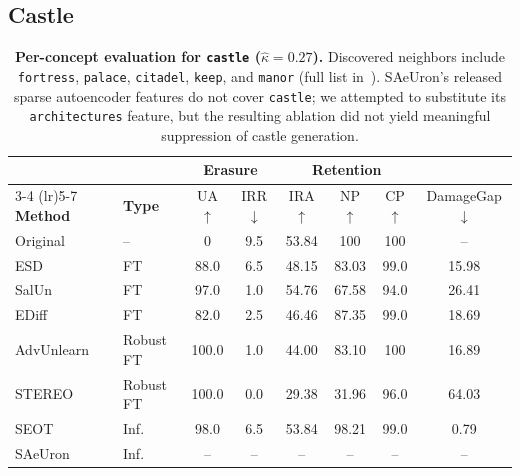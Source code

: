 \subsection{Castle}
\label{app:per_concept_castle}

\begin{table}[h]
\centering
\small
\setlength{\tabcolsep}{5pt}
\begin{tabular}{llcccccc}
\toprule
& & \multicolumn{2}{c}{\textbf{Erasure}} & \multicolumn{3}{c}{\textbf{Retention}} & \\
\cmidrule(lr){3-4} \cmidrule(lr){5-7}
\textbf{Method} & \textbf{Type} & UA$\uparrow$ & IRR$\downarrow$ & IRA$\uparrow$ & NP$\uparrow$ & CP$\uparrow$ & DamageGap$\downarrow$ \\
\midrule
Original    & --          & 0     & 9.5   & 53.84 & 100   & 100   & --    \\
\midrule
ESD         & FT          & 88.0  & 6.5   & 48.15 & 83.03 & 99.0  & 15.98 \\
SalUn       & FT          & 97.0  & 1.0   & 54.76 & 67.58 & 94.0  & 26.41 \\
EDiff       & FT          & 82.0  & 2.5   & 46.46 & 87.35 & 99.0  & 18.69 \\
\midrule
AdvUnlearn  & Robust FT   & 100.0 & 1.0   & 44.00 & 83.10 & 100   & 16.89 \\
STEREO      & Robust FT   & 100.0 & 0.0   & 29.38 & 31.96 & 96.0  & 64.03 \\
\midrule
SEOT        & Inf.        & 98.0  & 6.5   & 53.84 & 98.21 & 99.0  & 0.79  \\
SAeUron     & Inf.        & --    & --    & --    & --    & --    & --    \\
\bottomrule
\end{tabular}
\caption{\textbf{Per-concept evaluation for \texttt{castle} ($\hat\kappa = 0.27$).} Discovered neighbors include \texttt{fortress}, \texttt{palace}, \texttt{citadel}, \texttt{keep}, and \texttt{manor} (full list in~). SAeUron's released sparse autoencoder features do not cover \texttt{castle}; we attempted to substitute its \texttt{architectures} feature, but the resulting ablation did not yield meaningful suppression of castle generation.}
\label{tab:per_concept_castle}
\end{table}

